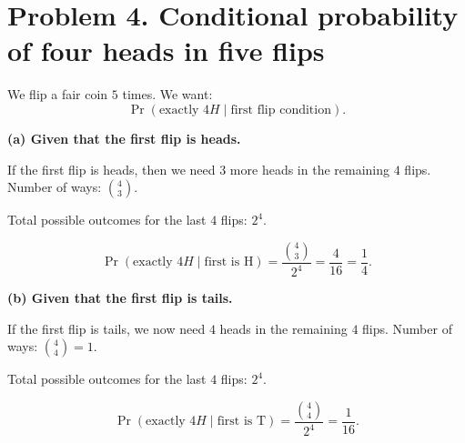 
\section*{Problem 4. Conditional probability of four heads in five flips}

We flip a fair coin $5$ times. We want:
\[
\Pr(\text{exactly }4H \mid \text{first flip condition}).
\]

\textbf{(a) Given that the first flip is heads.}

If the first flip is heads, then we need $3$ more heads in the remaining $4$ flips.  
Number of ways: $\binom{4}{3}$.

Total possible outcomes for the last $4$ flips: $2^4$.

\[
\Pr(\text{exactly }4H \mid \text{first is H}) = \frac{\binom{4}{3}}{2^4} = \frac{4}{16} = \frac{1}{4}.
\]

\textbf{(b) Given that the first flip is tails.}

If the first flip is tails, we now need $4$ heads in the remaining $4$ flips.  
Number of ways: $\binom{4}{4}=1$.

Total possible outcomes for the last $4$ flips: $2^4$.

\[
\Pr(\text{exactly }4H \mid \text{first is T}) = \frac{\binom{4}{4}}{2^4} = \frac{1}{16}.
\]

